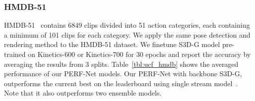 \documentclass[10pt,twocolumn,letterpaper]{article}
\begin{document}
\begin{table}[!htb]
\vspace{0.2cm}
\centering
\caption{ Comparison with state-of-the-art on UCF-101 and HMDB-51. The backbone of the PERF-Net here is S3D-G.}
\label{tbl:ucf_hmdb}
\end{table}

\subsubsection{HMDB-51}
HMDB-51~\cite{hmdb51_paper} contains 6849 clips divided into 51 action categories, each containing a minimum of 101 clips for each category.
We apply the same pose detection and rendering method to the HMDB-51 dataset.
We finetune S3D-G model pre-trained on Kinetics-600 or Kinetics-700 for 30 epochs and report the accuracy by averaging the results from 3 splits. 
Table~\ref{tbl:ucf_hmdb} shows the averaged performance of our PERF-Net models. Our PERF-Net with backbone S3D-G, outperforms the current best on the leaderboard using single stream model~\cite{hmdb_leaderboard}. Note that it also outperforms two ensemble models.
\end{document}
